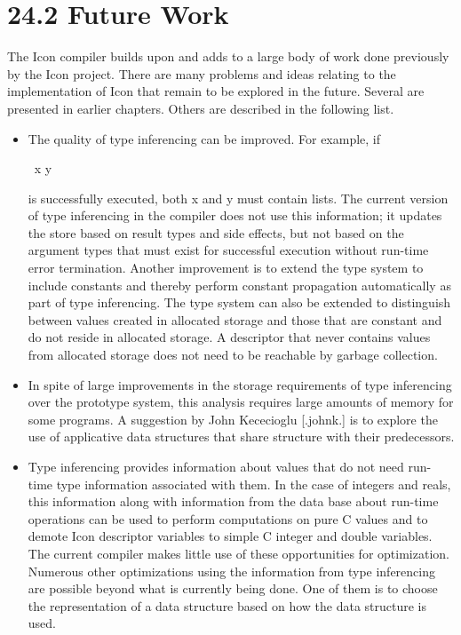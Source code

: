 \section[24.2 Future Work]{24.2 Future Work}

The Icon compiler builds upon and adds to a large body of work done
previously by the Icon project. There are many problems and ideas
relating to the implementation of Icon that remain to be explored in
the future. Several are presented in earlier chapters. Others are
described in the following list.

\liststyleLxxxv
\begin{itemize}
\item 
The quality of type inferencing can be improved. For example, if 

{\ttfamily
\ x {\textbar}{\textbar}{\textbar} y}

\noindent is successfully executed, both x and y must contain
lists. The current version of type inferencing in the compiler does
not use this information; it updates the store based on result types
and side effects, but not based on the argument types that must exist
for successful execution without run-time error termination. Another
improvement is to extend the type system to include constants and
thereby perform constant propagation automatically as part of type
inferencing.  The type system can also be extended to distinguish
between values created in allocated storage and those that are
constant and do not reside in allocated storage. A descriptor that
never contains values from allocated storage does not need to be
reachable by garbage collection.

\item In spite of large improvements in the storage requirements of
type inferencing over the prototype system, this analysis requires
large amounts of memory for some programs. A suggestion by John
Kececioglu [.johnk.] is to explore the use of applicative data
structures that share structure with their predecessors.

\item Type inferencing provides information about values that do not
need run-time type information associated with them. In the case of
integers and reals, this information along with information from the
data base about run-time operations can be used to perform
computations on pure C values and to demote Icon descriptor variables
to simple C integer and double variables. The current compiler makes
little use of these opportunities for optimization. Numerous other
optimizations using the information from type inferencing are possible
beyond what is currently being done. One of them is to choose the
representation of a data structure based on how the data structure is used.


\end{itemize}
